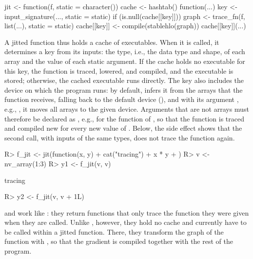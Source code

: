 \documentclass[article,shortnames]{jss}
\renewenvironment{CodeChunk}{\par\addvspace{0.6\baselineskip}\noindent\begin{minipage}{\linewidth}}{\end{minipage}\par\vspace{0.6\baselineskip}}
\begin{document}
\begin{Code}
jit <- function(f, static = character()) {
  cache <- hashtab()
  function(...) {
    key <- input_signature(..., static = static)
    if (is.null(cache[[key]])) {
      graph <- trace_fn(f, list(...), static = static)
      cache[[key]] <- compile(stablehlo(graph))
    }
    cache[[key]](...)
  }
}
\end{Code}

A jitted function thus holds a cache of executables.
When it is called, it determines a key from its inputs: the type, i.e., the data type and shape, of each array and the value of each static argument.
If the cache holds no executable for this key, the function is traced, lowered, and compiled, and the executable is stored; otherwise, the cached executable runs directly.
The key also includes the device on which the program runs: by default,  infers it from the arrays that the function receives, falling back to the default device (), and with its argument , e.g., , it moves all arrays to the given device.
Arguments that are not arrays must therefore be declared as , e.g.,  for the function  of , so that the function is traced and compiled new for every new value of .
Below, the side effect shows that the second call, with inputs of the same types, does not trace the function again.

\begin{CodeChunk}
\begin{CodeInput}
R> f_jit <- jit(function(x, y) {
+    cat("tracing\n")
+    x * y
+  })
R> v <- nv_array(1:3)
R> y1 <- f_jit(v, v)
\end{CodeInput}
\begin{CodeOutput}
tracing
\end{CodeOutput}
\begin{CodeInput}
R> y2 <- f_jit(v, v + 1L)
\end{CodeInput}
\end{CodeChunk}

 and  work like : they return functions that only trace the function they were given when they are called.
Unlike , however, they hold no cache and currently have to be called within a jitted function.
There, they transform the graph of the function with , so that the gradient is compiled together with the rest of the program.
\end{document}
